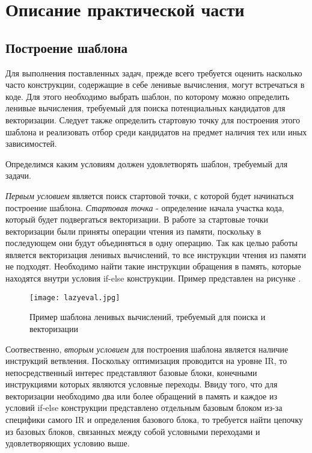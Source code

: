 \section{Описание практической части}
\label{sec:Chapter4} 


\subsection{Построение шаблона}
Для выполнения поставленных задач, прежде всего требуется оценить насколько часто конструкции, содержащие в себе ленивые вычисления, могут встречаться в коде. Для этого необходимо выбрать шаблон, по которому можно определить ленивые вычисления, требуемый для поиска потенциальных кандидатов для векторизации. Следует также определить стартовую точку для построения этого шаблона и реализовать отбор среди кандидатов на предмет наличия тех или иных зависимостей.

Определимся каким условиям должен удовлетворять шаблон, требуемый для задачи. 

\textit{Первым условием} является поиск стартовой точки, с которой будет начинаться построение шаблона. \textit{Стартовая точка} - определение начала участка кода, который будет подвергаться векторизации. В работе за стартовые точки векторизации были приняты операции чтения из памяти, поскольку в последующем они будут объединяться в одну операцию. Так как целью работы является векторизация ленивых вычислений, то все инструкции чтения из памяти не подходят. Необходимо найти такие инструкции обращения в память, которые находятся внутри условия if-else конструкции. Пример представлен на рисунке \todo[number].

\begin{figure}[!htb]
    \centering
    \texttt{[image: lazyeval.jpg]}
    \caption{Пример шаблона ленивых вычислений, требуемый для поиска и векторизации}
\end{figure}

Соотвественно, \textit{вторым условием} для построения шаблона является наличие инструкций ветвления. Поскольку оптимизация проводится на уровне IR, то непосредственный интерес представляют базовые блоки, конечными инструкциями которых являются условные переходы. Ввиду того, что для векторизации необходимо два или более обращений в память и каждое из условий if-else конструкции представлено отдельным базовым блоком из-за специфики самого IR и определения базового блока, то требуется найти цепочку из базовых блоков, связанных между собой условными переходами и удовлетворяющих условию выше.

